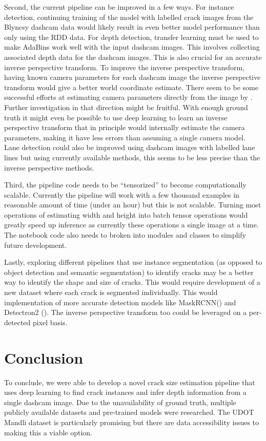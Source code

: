 \documentclass{article}
\begin{document}
Second, the current pipeline can be improved in a few ways. 
For instance detection, continuing training of the model with labelled crack images from the Blyncsy dashcam data would likely result in even better model performance than only using the RDD data.
For depth detection, transfer learning must be used to make AdaBins work well with the input dashcam images.
This involves collecting associated depth data for the dashcam images.
This is also crucial for an accurate inverse perspective transform.
To improve the inverse perspective transform, having known camera parameters for each dashcam image the inverse perspective transform would give a better world coordinate estimate. There seem to be some successful efforts at estimating camera parameters directly from the image by \cite{deeplearning_camera_calib}. 
Further investigation in that direction might be fruitful. 
With enough ground truth it might even be possible to use deep learning to learn an inverse perspective transform that in principle would internally estimate the camera parameters, making it have less errors than assuming a single camera model.
Lane detection could also be improved using dashcam images with labelled lane lines but using currently available methods, this seems to be less precise than the inverse perspective methods.

Third, the pipeline code needs to be ``tensorized'' to become computationally scalable.
Currently the pipeline will work with a few thousand examples in reasonable amount of time (under an hour) but this is not scalable.
Turning most operations of estimating width and height into batch tensor operations would greatly speed up inference as currently these operations a single image at a time.
The notebook code also needs to broken into modules and classes to simplify future development.

Lastly, exploring different pipelines that use instance segmentation (as opposed to object detection and semantic segmentation) to identify cracks may be a better way to identify the shape and size of cracks. This would require development of a new dataset where each crack is segmented individually. This would implementation of more accurate detection models like MaskRCNN(\cite{MaskRCNN}) and Detectron2 (\cite{wu2019detectron2}).
The inverse perspective transform too could be leveraged on a per-detected pixel basis.

\section{Conclusion}
To conclude, we were able to develop a novel crack size estimation pipeline that uses deep learning to find crack instances and infer depth information from a single dashcam image.
Due to the unavailability of ground truth, multiple publicly available datasets and pre-trained models were researched. The UDOT Mandli dataset is particularly promising but there are data accessibility issues to making this a viable option.
\end{document}

